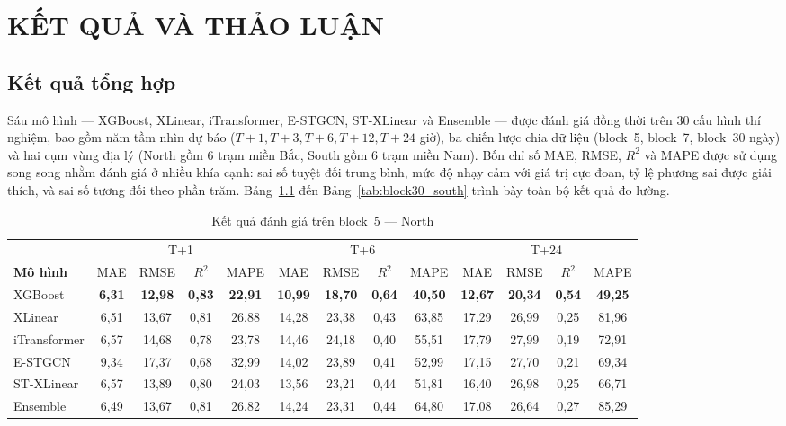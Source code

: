 \chapter{KẾT QUẢ VÀ THẢO LUẬN}

\section{Kết quả tổng hợp}

Sáu mô hình --- XGBoost, XLinear, iTransformer, E-STGCN, ST-XLinear và Ensemble --- được đánh giá đồng thời trên 30 cấu hình thí nghiệm, bao gồm năm tầm nhìn dự báo ($T{+}1, T{+}3, T{+}6, T{+}12, T{+}24$ giờ), ba chiến lược chia dữ liệu (block~5, block~7, block~30 ngày) và hai cụm vùng địa lý (North gồm 6 trạm miền Bắc, South gồm 6 trạm miền Nam). Bốn chỉ số MAE, RMSE, $R^2$ và MAPE được sử dụng song song nhằm đánh giá ở nhiều khía cạnh: sai số tuyệt đối trung bình, mức độ nhạy cảm với giá trị cực đoan, tỷ lệ phương sai được giải thích, và sai số tương đối theo phần trăm. Bảng~\ref{tab:block5_north} đến Bảng~\ref{tab:block30_south} trình bày toàn bộ kết quả đo lường.


\begin{table}[H]
\centering
\caption{Kết quả đánh giá trên block~5 --- North}
\label{tab:block5_north}
\small
\begin{tabular}{l|cccc|cccc|cccc}
\toprule
 & \multicolumn{4}{c|}{T+1} & \multicolumn{4}{c|}{T+6} & \multicolumn{4}{c}{T+24} \\
\textbf{Mô hình} & MAE & RMSE & $R^2$ & MAPE & MAE & RMSE & $R^2$ & MAPE & MAE & RMSE & $R^2$ & MAPE \\
\midrule
XGBoost     & \textbf{6,31} & \textbf{12,98} & \textbf{0,83} & \textbf{22,91} & \textbf{10,99} & \textbf{18,70} & \textbf{0,64} & \textbf{40,50} & \textbf{12,67} & \textbf{20,34} & \textbf{0,54} & \textbf{49,25} \\
XLinear     & 6,51 & 13,67 & 0,81 & 26,88 & 14,28 & 23,38 & 0,43 & 63,85 & 17,29 & 26,99 & 0,25 & 81,96 \\
iTransformer & 6,57 & 14,68 & 0,78 & 23,78 & 14,46 & 24,18 & 0,40 & 55,51 & 17,79 & 27,99 & 0,19 & 72,91 \\
E-STGCN     & 9,34 & 17,37 & 0,68 & 32,99 & 14,02 & 23,89 & 0,41 & 52,99 & 17,15 & 27,70 & 0,21 & 69,34 \\
ST-XLinear  & 6,57 & 13,89 & 0,80 & 24,03 & 13,56 & 23,21 & 0,44 & 51,81 & 16,40 & 26,98 & 0,25 & 66,71 \\
Ensemble    & 6,49 & 13,67 & 0,81 & 26,82 & 14,24 & 23,31 & 0,44 & 64,80 & 17,08 & 26,64 & 0,27 & 85,29 \\
\bottomrule
\end{tabular}
\end{table}

